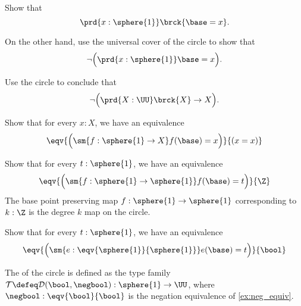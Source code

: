 
\begin{exercises}
  \exitem
  \begin{subexenum}
  \item Show that
    \begin{equation*}
      \prd{x:\sphere{1}}\brck{\base=x}.
    \end{equation*}
  \item On the other hand, use the universal cover of the circle to show that
    \begin{equation*}
      \neg\Big(\prd{x:\sphere{1}}\base=x\Big).
    \end{equation*}
  \item Use the circle to conclude that
    \begin{equation*}
      \neg\Big(\prd{X:\UU} \brck{X}\to X\Big).
    \end{equation*}
  \end{subexenum}
  \exitem \label{ex:circle_degk}
\begin{subexenum}
\item Show that for every $x:X$, we have an equivalence
\begin{equation*}
\eqv{\Big(\sm{f:\sphere{1}\to X}f(\base)= x \Big)}{(x=x)}
\end{equation*}
\item Show that for every $t:\sphere{1}$, we have an equivalence
\begin{equation*}
\eqv{\Big(\sm{f:\sphere{1}\to \sphere{1}}f(\base)= t \Big)}{\Z}
\end{equation*}
The base point preserving map $f:\sphere{1}\to\sphere{1}$ corresponding to $k:\Z$ is the degree $k$ map on the circle.
\item Show that for every $t:\sphere{1}$, we have an equivalence
\begin{equation*}
\eqv{\Big(\sm{e:\eqv{\sphere{1}}{\sphere{1}}}e(\base)= t \Big)}{\bool}
\end{equation*}
\end{subexenum}
\exitem \label{ex:circle_double_cover} The  of the circle is defined as the type family $\mathcal{T}\defeq\mathcal{D}(\bool,\negbool):\sphere{1}\to\UU$, where $\negbool:\eqv{\bool}{\bool}$ is the negation equivalence of \cref{ex:neg_equiv}.

\end{exercises}
